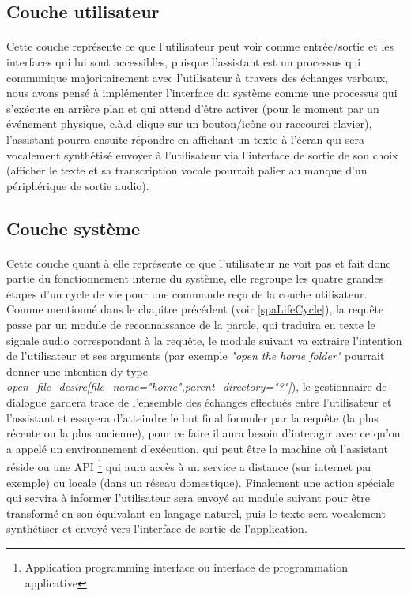 	\subsection{Couche utilisateur}
	\paragraph{}
	Cette couche représente ce que l'utilisateur peut voir comme entrée/sortie et les interfaces qui lui sont accessibles, puisque l'assistant est un processus qui communique majoritairement avec l'utilisateur à travers des échanges verbaux, nous avons pensé à implémenter l'interface du système comme une processus qui s'exécute en arrière plan et qui attend d'être activer (pour le moment par un événement physique, c.à.d clique sur un bouton/icône ou raccourci clavier), l'assistant pourra ensuite répondre en affichant un texte à l'écran qui sera vocalement synthétisé envoyer à l'utilisateur via l'interface de sortie de son choix (afficher le texte et sa transcription vocale pourrait palier au manque d'un périphérique de sortie audio).
	\subsection{Couche système}
	
	\paragraph{}
	\label{system_layer}
	Cette couche quant à elle représente ce que l'utilisateur ne voit pas et fait donc partie du fonctionnement interne du système, elle regroupe les quatre grandes étapes d'un cycle de vie pour une commande reçu de la couche utilisateur. Comme mentionné dans le chapitre précédent (voir \ref{spaLifeCycle}), la requête passe par un module de reconnaissance de la parole, qui traduira en texte le signale audio correspondant à la requête, le module suivant va extraire l'intention de l'utilisateur et ses arguments (par exemple \textit{"open the home folder"} pourrait donner  une intention dy type  \textit{open\_file\_desire[file\_name="home",parent\_directory="?"]}), le gestionnaire de dialogue gardera trace de l'ensemble des échanges effectués entre l'utilisateur et l'assistant et essayera d'atteindre le but final formuler par la requête (la plus récente ou la plus ancienne), pour ce faire il aura besoin d'interagir avec ce qu'on a appelé un environnement d'exécution, qui peut être la machine où l'assistant réside ou une API \footnote{Application programming interface ou interface de programmation applicative } qui aura accès à un service a distance (sur internet par exemple) ou locale (dans un réseau domestique). Finalement une action spéciale qui servira à informer l'utilisateur sera envoyé au module suivant pour être transformé en son équivalant en langage naturel, puis le texte sera vocalement synthétiser et envoyé vers l'interface de sortie de l'application.
	
